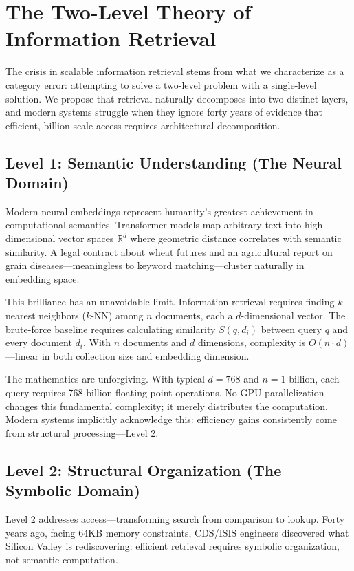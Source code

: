 \documentclass[manuscript,screen,nonacm]{acmart}
\begin{document}
\section{The Two-Level Theory of Information Retrieval}

The crisis in scalable information retrieval stems from what we characterize as a category error: attempting to solve a two-level problem with a single-level solution. We propose that retrieval naturally decomposes into two distinct layers, and modern systems struggle when they ignore forty years of evidence that efficient, billion-scale access requires architectural decomposition.

\subsection{Level 1: Semantic Understanding (The Neural Domain)}

Modern neural embeddings represent humanity's greatest achievement in computational semantics. Transformer models map arbitrary text into high-dimensional vector spaces $\mathbb{R}^d$ where geometric distance correlates with semantic similarity. A legal contract about wheat futures and an agricultural report on grain diseases---meaningless to keyword matching---cluster naturally in embedding space.

This brilliance has an unavoidable limit. Information retrieval requires finding $k$-nearest neighbors ($k$-NN) among $n$ documents, each a $d$-dimensional vector. The brute-force baseline requires calculating similarity $S(q, d_i)$ between query $q$ and every document $d_i$. With $n$ documents and $d$ dimensions, complexity is $O(n \cdot d)$---linear in both collection size and embedding dimension.

The mathematics are unforgiving. With typical $d=768$ and $n=1$ billion, each query requires 768 billion floating-point operations. No GPU parallelization changes this fundamental complexity; it merely distributes the computation. Modern systems implicitly acknowledge this: efficiency gains consistently come from structural processing---Level 2.

\subsection{Level 2: Structural Organization (The Symbolic Domain)}

Level 2 addresses access---transforming search from comparison to lookup. Forty years ago, facing 64KB memory constraints, CDS/ISIS engineers discovered what Silicon Valley is rediscovering: efficient retrieval requires symbolic organization, not semantic computation.
\end{document}
